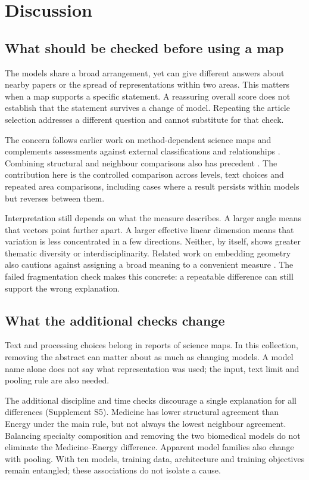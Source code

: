 \section{Discussion}
\subsection{What should be checked before using a map}
The models share a broad arrangement, yet can give different answers about nearby papers or the spread of representations within two areas. This matters when a map supports a specific statement. A reassuring overall score does not establish that the statement survives a change of model. Repeating the article selection addresses a different question and cannot substitute for that check.

The concern follows earlier work on method-dependent science maps \citep{refa0d2d707e6,ref6a2f5912bc} and complements assessments against external classifications and relationships \citep{refbe130e2973,refc0e2cc29e0}. Combining structural and neighbour comparisons also has precedent \citep{ref4e1e0d5582}. The contribution here is the controlled comparison across levels, text choices and repeated area comparisons, including cases where a result persists within models but reverses between them.

Interpretation still depends on what the measure describes. A larger angle means that vectors point further apart. A larger effective linear dimension means that variation is less concentrated in a few directions. Neither, by itself, shows greater thematic diversity or interdisciplinarity. Related work on embedding geometry also cautions against assigning a broad meaning to a convenient measure \citep{rudman-etal-2022-isoscore}. The failed fragmentation check makes this concrete: a repeatable difference can still support the wrong explanation.

\subsection{What the additional checks change}
Text and processing choices belong in reports of science maps. In this collection, removing the abstract can matter about as much as changing models. A model name alone does not say what representation was used; the input, text limit and pooling rule are also needed.

The additional discipline and time checks discourage a single explanation for all differences (Supplement S5). Medicine has lower structural agreement than Energy under the main rule, but not always the lowest neighbour agreement. Balancing specialty composition and removing the two biomedical models do not eliminate the Medicine--Energy difference. Apparent model families also change with pooling. With ten models, training data, architecture and training objectives remain entangled; these associations do not isolate a cause.

